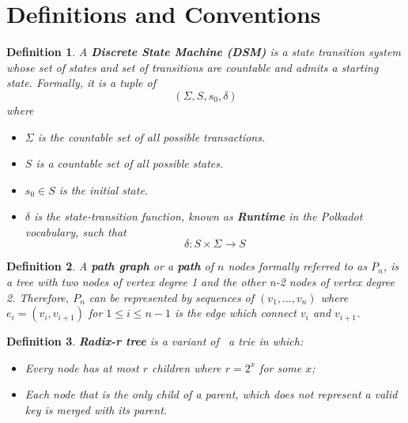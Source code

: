 \documentclass{book}
\newcommand{\tmstrong}[1]{\textbf{#1}}
\newcommand{\tmtextbf}[1]{{\bfseries{#1}}}
\newtheorem{definition}{Definition}
\providecommand{\tmstrong}[1]{\tmtextbf{#1}}
\providecommand{\tmtextbf}[1]{\tmtextbf{#1}}
\newtheorem{definition}{Definition}
\begin{document}
\section{Definitions and Conventions}\label{sect-defn-conv}

\begin{definition}
  \label{defn-state-machine}A {\tmstrong{Discrete State Machine (DSM)}} is a
  state transition system whose set of states and set of transitions are
  countable and admits a starting state. Formally, it is a tuple of
  \[  (\Sigma, S, s_0, \delta) \]
  where
  \begin{itemize}
    \item $\Sigma$ is the countable set of all possible transactions.
    
    \item $S$ is a countable set of all possible states.
    
    \item $s_0 \in S$ is the initial state.
    
    \item $\delta$ is the state-transition function, known as
    \label{defn-runtime}{\tmstrong{Runtime}} in the Polkadot vocabulary, such
    that
    \[ \delta : S \times \Sigma \rightarrow S \]
  \end{itemize}
\end{definition}

\begin{definition}
  \label{defn-path-graph}A {\tmstrong{path graph}} or a {\tmstrong{path}} of
  $n$ nodes formally referred to as {\tmstrong{$P_n$}}, is a tree with two
  nodes of vertex degree 1 and the other n-2 nodes of vertex degree 2.
  Therefore, $P_n$ can be represented by sequences of $(v_1, \ldots, v_n)$
  where $e_i = (v_i, v_{i + 1})$ for $1 \leqslant i \leqslant n - 1$ is the
  edge which connect $v_i$ and $v_{i + 1}$.
\end{definition}

\begin{definition}
  \label{defn-radix-tree}{\tmstrong{Radix-r tree}} is a variant of \ a trie in
  which:
  \begin{itemize}
    \item Every node has at most $r$ children where $r = 2^x$ for some $x$;
    
    \item Each node that is the only child of a parent, which does not
    represent a valid key is merged with its parent.
  \end{itemize}
\end{definition}
\end{document}
